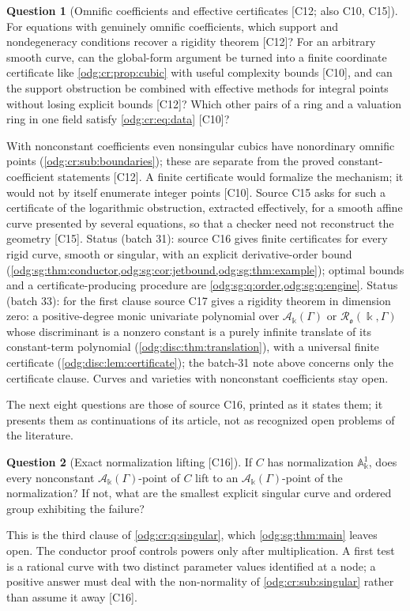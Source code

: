 \documentclass[11pt,oneside]{article}
\numberwithin{equation}{section}
\theoremstyle{definition}
\newtheorem{question}[question]{Question}
\theoremstyle{remark}
\newcommand{\src}[1]{\textup{\textsf{\small[#1]}}}
\newcommand{\crA}{\mathcal A_\Bbbk(\Gamma)}
\newcommand{\Aff}{\mathbb A}
\begin{document}
\begin{question}[Omnific coefficients and effective certificates \src{C12; also C10, C15}]\label{odg:cr:q:coefficients}
For equations with genuinely omnific coefficients, which support and nondegeneracy
conditions recover a rigidity theorem \src{C12}? For an arbitrary smooth curve, can
the global-form argument be turned into a finite coordinate certificate like
\cref{odg:cr:prop:cubic} with useful complexity bounds \src{C10}, and can the support
obstruction be combined with effective methods for integral points without losing
explicit bounds \src{C12}? Which other pairs of a ring and a valuation ring in one
field satisfy \eqref{odg:cr:eq:data} \src{C10}?
\end{question}
With nonconstant coefficients even nonsingular cubics have nonordinary omnific points
(\cref{odg:cr:sub:boundaries}); these are separate from the proved constant-coefficient
statements \src{C12}. A finite certificate would formalize the mechanism; it would not
by itself enumerate integer points \src{C10}. Source C15 asks for such a certificate of the
logarithmic obstruction, extracted effectively, for a smooth affine curve presented by
several equations, so that a checker need not reconstruct the geometry \src{C15}. Status
(batch 31): source C16 gives finite certificates for every rigid curve, smooth or singular,
with an explicit derivative-order bound (\cref{odg:sg:thm:conductor,odg:sg:cor:jetbound,odg:sg:thm:example});
optimal bounds and a certificate-producing procedure are \cref{odg:sg:q:order,odg:sg:q:engine}.
Status (batch 33): for the first clause source C17 gives a rigidity theorem in dimension zero:
a positive-degree monic univariate polynomial over $\crA$ or $\mathcal R_{\mathfrak o}(\Bbbk,\Gamma)$ whose
discriminant is a nonzero constant is a purely infinite translate of its constant-term
polynomial (\cref{odg:disc:thm:translation}), with a universal finite certificate
(\cref{odg:disc:lem:certificate}); the batch-31 note above concerns only the certificate
clause. Curves and varieties with nonconstant coefficients stay open.

The next eight questions are those of source C16, printed as it states them; it presents
them as continuations of its article, not as recognized open problems of the literature.

\begin{question}[Exact normalization lifting \src{C16}]\label{odg:sg:q:lifting}
If $C$ has normalization $\Aff^1_\Bbbk$, does every nonconstant $\crA$-point of $C$ lift to an
$\crA$-point of the normalization? If not, what are the smallest explicit singular curve and
ordered group exhibiting the failure?
\end{question}
This is the third clause of \cref{odg:cr:q:singular}, which \cref{odg:sg:thm:main} leaves
open. The conductor proof controls powers only after multiplication. A first test is a
rational curve with two distinct parameter values identified at a node; a positive answer
must deal with the non-normality of \cref{odg:cr:sub:singular} rather than assume it away
\src{C16}.
\end{document}
